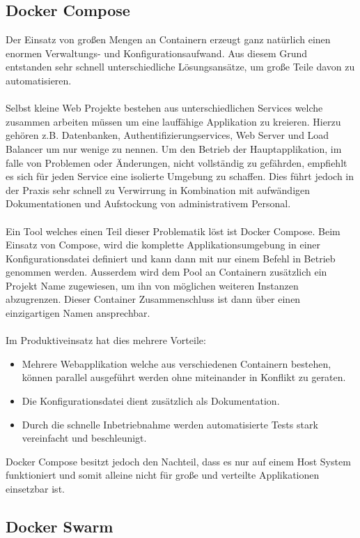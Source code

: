 \documentclass[12pt,toc=bib,toc=listof]{scrreprt}
\begin{document}
\subsection{Docker Compose}
Der Einsatz von großen Mengen an Containern erzeugt ganz natürlich einen enormen Verwaltungs- und Konfigurationsaufwand.
Aus diesem Grund entstanden sehr schnell unterschiedliche Lösungsansätze, um große Teile davon zu automatisieren.\\
\\
Selbst kleine Web Projekte bestehen aus unterschiedlichen Services welche zusammen arbeiten müssen um eine lauffähige Applikation zu kreieren.
Hierzu gehören z.B. Datenbanken, Authentifizierungservices, Web Server und Load Balancer um nur wenige zu nennen.
Um den Betrieb der Hauptapplikation, im falle von Problemen oder Änderungen, nicht vollständig zu gefährden, empfiehlt es sich für jeden Service eine isolierte Umgebung zu schaffen.
Dies führt jedoch in der Praxis sehr schnell zu Verwirrung in Kombination mit aufwändigen Dokumentationen und Aufstockung von administrativem Personal.\\
\\
Ein Tool welches einen Teil dieser Problematik löst ist Docker Compose.
Beim Einsatz von Compose, wird die komplette Applikationsumgebung in einer Konfigurationsdatei definiert und kann dann mit nur einem Befehl in Betrieb genommen werden.
Ausserdem wird dem Pool an Containern zusätzlich ein Projekt Name zugewiesen, um ihn von möglichen weiteren Instanzen abzugrenzen.
Dieser Container Zusammenschluss ist dann über einen einzigartigen Namen ansprechbar.\\
\\
Im Produktiveinsatz hat dies mehrere Vorteile:
\begin{itemize}
\item Mehrere Webapplikation welche aus verschiedenen Containern bestehen, können parallel ausgeführt werden ohne miteinander in Konflikt zu geraten.
\item Die Konfigurationsdatei dient zusätzlich als Dokumentation.
\item Durch die schnelle Inbetriebnahme werden automatisierte Tests stark vereinfacht und beschleunigt.
\end{itemize}
Docker Compose besitzt jedoch den Nachteil, dass es nur auf einem Host System funktioniert und somit alleine nicht für große und verteilte Applikationen einsetzbar ist.  
\subsection{Docker Swarm}
\end{document}
